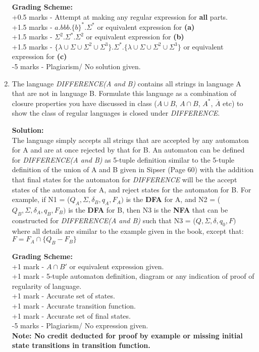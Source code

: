 \documentclass[11pt, article, oneside]{memoir}
\begin{document}
\begin{enumerate}
        \textbf{Grading Scheme:}
        \\+0.5 marks - Attempt at making any regular expression for \textbf{all} parts.
        \\+1.5 marks - \(a.bbb.\{b\}^*.\Sigma^*\) or equivalent expression for \textbf{(a)}
        \\+1.5 marks - \(\Sigma^2.\Sigma^*.\Sigma^2\) or equivalent expression for \textbf{(b)}
        \\+1.5 marks - \(\{\lambda \cup \Sigma \cup \Sigma^2 \cup \Sigma^3\}.\Sigma^*.\{\lambda \cup \Sigma \cup \Sigma^2 \cup \Sigma^3\}\) or equivalent expression for \textbf{(c)}
        \\-5 marks -  Plagiarism/ No solution given.
    \item
        The language \textit{DIFFERENCE(A and B)} contains all strings in language A that are not in language B. Formulate this language as a combination of closure properties you have discussed in class ($A \cup B$, $A \cap B$, $A^*$, $\overline{A}$ etc) to show the class of regular languages is closed under \textit{DIFFERENCE}.
                
        \textbf{Solution:}
        \\The language simply accepts all strings that are accepted by any automaton for A and are at once rejected by that for B. An automaton can be defined  for \textit{DIFFERENCE(A and B)} as 5-tuple definition similar to the 5-tuple definition of the union of A and B given in Sipser (Page 60) with the addition that final states for the automaton for \textit{DIFFERENCE} will be the accept states of the automaton for A, and reject states for the automaton for B. For example, if N1 = (\(Q_A, \Sigma, \delta_B, q_A, F_A)\) is the \textbf{DFA} for A, and N2 = (\(Q_B, \Sigma, \delta_A, q_B, F_B)\) is the \textbf{DFA} for B, then N3 is the \textbf{NFA} that can be constructed for \textit{DIFFERENCE(A and B)} such that N3 = (\(Q, \Sigma, \delta, q_0, F)\) where all details are similar to the example given in the book, except that: \( F = F_A \cap \{Q_B - F_B\} \)

        \textbf{Grading Scheme:}
        \\+1 mark - \(A \cap B'\) or equivalent expression given.
        \\+1 mark - 5-tuple automaton definition, diagram or any indication of proof of regularity of language.
        \\+1 mark - Accurate set of states.
        \\+1 mark - Accurate transition function.
        \\+1 mark - Accurate set of final states.
        \\-5 marks -  Plagiarism/ No expression given.
        \\\textbf{Note: No credit deducted for proof by example or missing initial state transitions in transition function.}
        
\end{enumerate}
\end{document}
